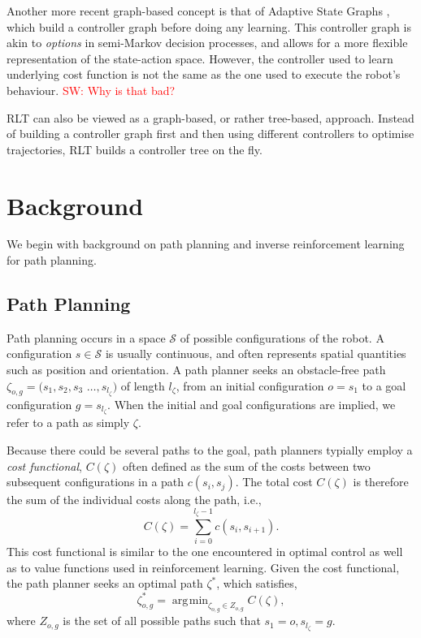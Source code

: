 \documentclass{article}  %
\DeclareMathOperator*{\argmin}{\arg\!\min}
\newcommand{\sw}[1]{\textcolor{red}{SW: #1}}
\begin{document}
Another more recent graph-based concept is that of Adaptive State Graphs \cite{okallearning}, which build a controller graph before doing any learning. This controller graph is akin to \emph{options} in semi-Markov decision processes, and allows for a more flexible representation of the state-action space. However, the controller used to learn underlying cost function is not the same as the one used to execute the robot's behaviour. \sw{Why is that bad?}

RLT can also be viewed as a graph-based, or rather tree-based, approach. Instead of building a controller graph first and then using different controllers to optimise trajectories, RLT builds a controller tree on the fly.


\section{Background}
We begin with background on path planning and inverse reinforcement learning for path planning.

\subsection{Path Planning \label{subsec:path_planning}}
Path planning occurs in a space $\mathcal{S}$ of possible configurations of the robot. A configuration $s \in \mathcal{S}$ is usually continuous, and often represents spatial quantities such as position and orientation. A path planner seeks an obstacle-free path $\zeta_{o,g} = (s_1,s_2,s_3$ $\ldots,s_{l_{\zeta}}) $ of length $l_{\zeta}$, from an initial configuration $o = s_1$ to a goal configuration  $g =s_{l_{\zeta}}$. When the initial and goal configurations are implied, we refer to a path as simply $\zeta$.

Because there could be several paths to the goal, path planners typially employ a \emph{cost functional}, $C(\zeta)$ often defined as the sum of the costs between two subsequent configurations in a path $c(s_i,s_j)$. The total cost $C(\zeta)$ is therefore the sum of the individual costs along the path, i.e.,
\begin{equation}
	C(\zeta) = \sum_{i=0}^{l_{\zeta}-1} c(s_i,s_{i+1}).
\end{equation}
This cost functional is similar to the one encountered in optimal control as well as to value functions used in reinforcement learning. Given the cost functional, the path planner seeks an optimal path $\zeta^*$, which satisfies,
\begin{equation}
 	\zeta^*_{o,g} = \argmin_{\zeta_{o,g} \in Z_{o,g}} C(\zeta), \label{eq:back_plan}
\end{equation}
where $Z_{o,g}$ is the set of all possible paths such that $s_1 = o, s_{l_\zeta} = g$.
\end{document}
